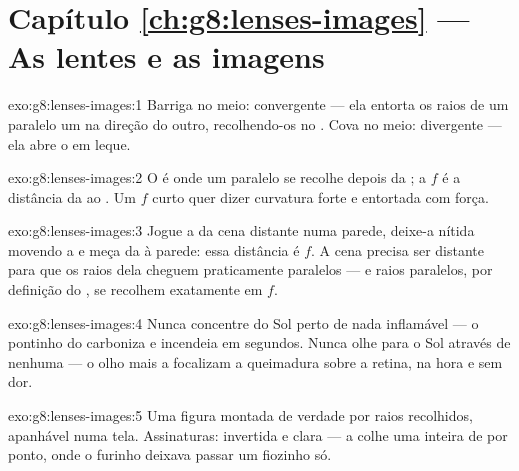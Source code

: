 \section*{Capítulo \ref{ch:g8:lenses-images} --- As lentes e as imagens}

\begin{solution}{exo:g8:lenses-images:1}
Barriga no meio: convergente --- ela entorta os raios de um 
paralelo um na direção do outro, recolhendo-os no . Cova no meio:
divergente --- ela abre o  em leque.
\end{solution}

\begin{solution}{exo:g8:lenses-images:2}
O  é onde um  paralelo se recolhe depois da ; a
 $f$ é a distância da  ao . Um $f$ curto quer
dizer curvatura forte e entortada com força.
\end{solution}

\begin{solution}{exo:g8:lenses-images:3}
Jogue a  da cena distante numa parede, deixe-a nítida movendo a
 e meça da  à parede: essa distância é $f$. A cena precisa
ser distante para que os raios dela cheguem praticamente paralelos
--- e raios paralelos, por definição do , se recolhem exatamente
em $f$.
\end{solution}

\begin{solution}{exo:g8:lenses-images:4}
Nunca concentre  do Sol perto de nada inflamável --- o pontinho do
 carboniza e incendeia em segundos. Nunca olhe para o Sol através
de  nenhuma --- o olho mais a  focalizam a queimadura sobre
a retina, na hora e sem dor.
\end{solution}

\begin{solution}{exo:g8:lenses-images:5}
Uma figura montada de verdade por raios recolhidos, apanhável numa
tela. Assinaturas: invertida e clara --- a  colhe uma 
inteira de  por ponto, onde o furinho deixava passar um fiozinho
só.
\end{solution}

